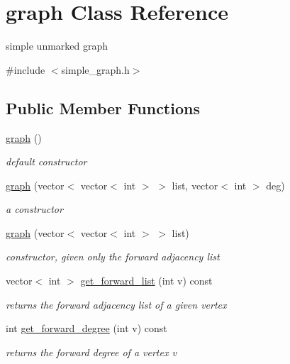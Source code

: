 \hypertarget{classgraph}{}\section{graph Class Reference}
\label{classgraph}


simple unmarked graph  




{\ttfamily \#include $<$simple\+\_\+graph.\+h$>$}

\subsection*{Public Member Functions}
\begin{DoxyCompactItemize}
\item 
\hyperlink{classgraph_a6aaa56b4528d2fdb8f0ecd97e04f6651}{graph} ()
\begin{DoxyCompactList}\small\item\em default constructor \end{DoxyCompactList}\item 
\hyperlink{classgraph_a0f89acfea28c8996a0d8df4d07e6ecf2}{graph} (vector$<$ vector$<$ int $>$ $>$ list, vector$<$ int $>$ deg)
\begin{DoxyCompactList}\small\item\em a constructor \end{DoxyCompactList}\item 
\hyperlink{classgraph_afad830c445cfc831ee37eb755170a4a7}{graph} (vector$<$ vector$<$ int $>$ $>$ list)
\begin{DoxyCompactList}\small\item\em constructor, given only the forward adjacency list \end{DoxyCompactList}\item 
vector$<$ int $>$ \hyperlink{classgraph_aa8fbee52a7b3604dbbd9175040c7ead5}{get\+\_\+forward\+\_\+list} (int v) const
\begin{DoxyCompactList}\small\item\em returns the forward adjacency list of a given vertex \end{DoxyCompactList}\item 
int \hyperlink{classgraph_a388b6ce292a4c49e3853e22bdce978de}{get\+\_\+forward\+\_\+degree} (int v) const
\begin{DoxyCompactList}\small\item\em returns the forward degree of a vertex v \end{DoxyCompactList}\item 

\end{DoxyCompactItemize}
